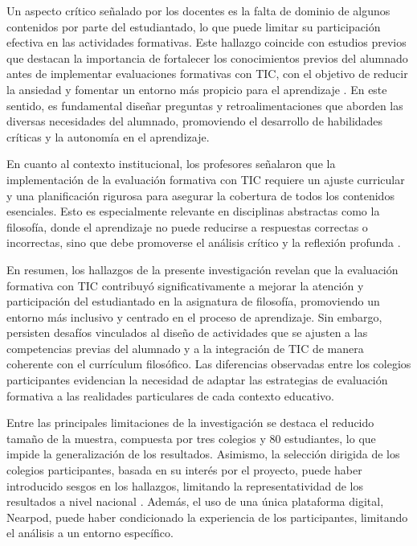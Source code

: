 \documentclass[spanish]{textolivre}
\begin{document}
Un aspecto crítico señalado por los docentes es la falta de dominio de algunos contenidos por parte del estudiantado, lo que puede limitar su participación efectiva en las actividades formativas. Este hallazgo coincide con estudios previos que destacan la importancia de fortalecer los conocimientos previos del alumnado antes de implementar evaluaciones formativas con TIC, con el objetivo de reducir la ansiedad y fomentar un entorno más propicio para el aprendizaje \cite{bizarro2019, orellana2020}. En este sentido, es fundamental diseñar preguntas y retroalimentaciones que aborden las diversas necesidades del alumnado, promoviendo el desarrollo de habilidades críticas y la autonomía en el aprendizaje.

En cuanto al contexto institucional, los profesores señalaron que la implementación de la evaluación formativa con TIC requiere un ajuste curricular y una planificación rigurosa para asegurar la cobertura de todos los contenidos esenciales. Esto es especialmente relevante en disciplinas abstractas como la filosofía, donde el aprendizaje no puede reducirse a respuestas correctas o incorrectas, sino que debe promoverse el análisis crítico y la reflexión profunda \cite{hidalgo2021, lopez-pastor2011}.

En resumen, los hallazgos de la presente investigación revelan que la evaluación formativa con TIC contribuyó significativamente a mejorar la atención y participación del estudiantado en la asignatura de filosofía, promoviendo un entorno más inclusivo y centrado en el proceso de aprendizaje. Sin embargo, persisten desafíos vinculados al diseño de actividades que se ajusten a las competencias previas del alumnado y a la integración de TIC de manera coherente con el currículum filosófico. Las diferencias observadas entre los colegios participantes evidencian la necesidad de adaptar las estrategias de evaluación formativa a las realidades particulares de cada contexto educativo.

Entre las principales limitaciones de la investigación se destaca el reducido tamaño de la muestra, compuesta por tres colegios y 80 estudiantes, lo que impide la generalización de los resultados. Asimismo, la selección dirigida de los colegios participantes, basada en su interés por el proyecto, puede haber introducido sesgos en los hallazgos, limitando la representatividad de los resultados a nivel nacional \cite{ortega2022}. Además, el uso de una única plataforma digital, Nearpod, puede haber condicionado la experiencia de los participantes, limitando el análisis a un entorno específico.
\end{document}
